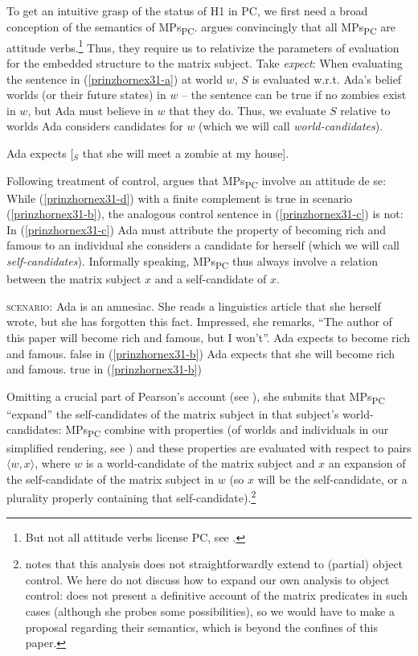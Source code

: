 \documentclass[output=paper]{langscibook}
\begin{document}
To get an intuitive grasp of the status of H1 in PC, we first need a broad conception of the semantics of MPs\textsubscript{PC}. \citet{Pearson:2016} argues convincingly that all MPs\textsubscript{PC} are attitude verbs.\footnote{But not all attitude verbs license PC, see .} Thus, they require us to relativize the parameters of evaluation for the embedded structure to the matrix subject. Take \textit{expect}: When evaluating the sentence in (\ref{prinzhornex31-a}) at world $w$, $S$ is evaluated w.r.t. Ada's belief worlds (or their future states) in $w$ -- the sentence can be true if no zombies exist in $w$, but Ada must believe in $w$ that they do. Thus, we evaluate $S$ relative to worlds  Ada considers candidates for $w$ (which we will call \emph{world-candidates}).

\ea\label{prinzhornex31-a} Ada expects [$_{S}$ that she will meet a zombie at my house]. \z

Following   treatment of control, \citet{Pearson:2016} argues that MPs\textsubscript{PC} involve an attitude de se: While (\ref{prinzhornex31-d}) with a finite complement is true in scenario (\ref{prinzhornex31-b}), the analogous control sentence  in (\ref{prinzhornex31-c}) is not: In (\ref{prinzhornex31-c}) Ada must attribute the property of becoming rich and famous to an individual she considers a candidate for herself (which we will call \emph{self-candidates}). Informally speaking, MPs\textsubscript{PC} thus always involve a relation between the matrix subject $x$ and a self-candidate of $x$.


\ea 
\ea  \textsc{scenario:} Ada is an amnesiac. She reads a linguistics article that she herself wrote, but she has forgotten this fact. Impressed, she remarks, “The author of this paper will become rich and famous, but I won't”. \label{prinzhornex31-b}
\ex Ada expects to become rich and famous. \hfill {false} in (\ref{prinzhornex31-b}) \label{prinzhornex31-c}
\ex Ada expects that she will become rich and famous.  \hfill {true} in (\ref{prinzhornex31-b})
\newline \phantom{.}\hfill \citep[cf.][(9)]{Pearson:2016} \label{prinzhornex31-d}
\z\z 

Omitting a crucial part of Pearson's account (see ), she submits that MPs\textsubscript{PC} “expand” the self-candidates of the matrix subject in that subject's world-can\-di\-dates: MPs\textsubscript{PC} combine with properties (of worlds and individuals in our simplified rendering, see \citealt{Chierchia:1989}) and these properties are evaluated with respect to pairs $\langle w, x \rangle$, where $w$ is a world-candidate of the matrix subject and $x$ an expansion of the self-candidate of the matrix subject in $w$ (so $x$ will be the self-candidate, or a plurality properly containing that self-candidate).\footnote{\citet{Pearson:2016} notes that this analysis does not straightforwardly extend to (partial) object control. We here do not discuss how to expand our own analysis to object control: \citet{Pearson:2016} does not present a definitive account of the matrix predicates in such cases (although she probes some possibilities), so we would have to make a proposal regarding their semantics, which is beyond the confines of this paper.}
\end{document}
